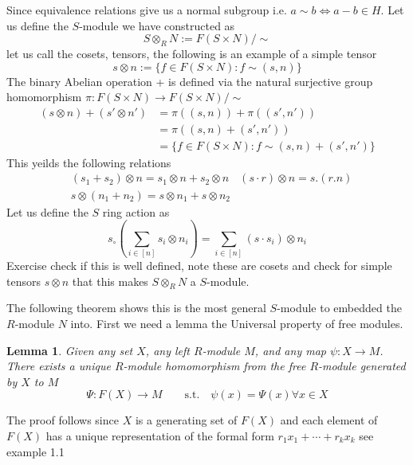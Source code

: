 \documentclass{article}
\theoremstyle{plain}
\newtheorem{lemma}{Lemma}[section]
\theoremstyle{definition}
\theoremstyle{remark}
\begin{document}
  Since equivalence relations give us a normal subgroup i.e. $a\sim b \iff a-b\in H$.
  Let us define the $S$-module we have constructed as 
  \[S\otimes_R N :=F(S\times N)/\sim \]
  let us call the cosets, tensors, the following is an example
  of a simple tensor
  \[s\otimes n:=\{f\in F(S\times N):f\sim (s,n)\}\]
  The binary Abelian operation + is defined via the natural surjective
  group homomorphism $\pi:F(S\times N)\to F(S\times N)/\sim$
  \begin{align*}
    (s\otimes n)+(s'\otimes n') &= \pi((s,n))+\pi((s',n')) \\
     &= \pi((s,n)+(s',n')) \\
     &= \{f\in F(S\times N):f\sim (s,n)+(s',n')\}
  \end{align*}
  This yeilds the following relations
  \begin{align*}
    &(s_1+s_2)\otimes n = s_1\otimes n + s_2\otimes n
    &(s\cdot r)\otimes n = s.(r.n)\\
    &s\otimes(n_1+n_2)=s\otimes n_1+ s\otimes n_2
  \end{align*}
  Let us define the $S$ ring action as
  \[s_\circ\left(\sum_{i\in[n]}s_i\otimes n_i\right)
   = \sum_{i\in[n]}(s\cdot s_i)\otimes n_i\]
  Exercise check if this is well defined, note these are cosets and
  check for simple tensors $s\otimes n$ that this makes $S\otimes_R N$ a
  $S$-module.
 

  The following theorem shows this is the most general $S$-module to embedded
  the $R$-module $N$ into. First we need a lemma the Universal property of 
  free modules.
  \begin{lemma}
    Given any set $X$, any left $R$-module $M$, and any map $\psi:X\to M$.
    There exists a unique $R$-module homomorphism from the free 
    $R$-module generated by $X$ to $M$    
    \[\Psi:F(X)\to M \qquad\text{s.t.}\quad \psi(x)=\Psi(x) \forall x\in X \]
  \end{lemma}
  The proof follows since $X$ is a generating set of $F(X)$ and each element
  of $F(X)$ has a unique representation of the formal 
  form $r_1x_1+\cdots+r_kx_k$ see example 1.1
\end{document}
